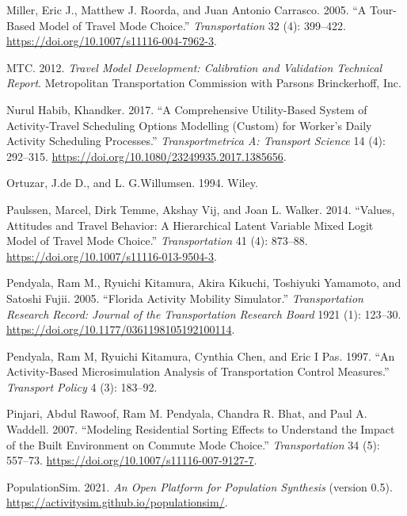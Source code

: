 \documentclass[12pt, oneside, openright]{byuthesis}
\newlength{\cslhangindent}
\newlength{\cslentryspacingunit} %
\newenvironment{CSLReferences}[2] %
 {%
  \setlength{\parindent}{0pt}
  \ifodd #1
  \let\oldpar\par
  \def\par{\hangindent=\cslhangindent\oldpar}
  \fi
  \setlength{\parskip}{#2\cslentryspacingunit}
 }%
 {}
\begin{document}
\begin{CSLReferences}{1}{0}
\leavevmode{}%
Miller, Eric J., Matthew J. Roorda, and Juan Antonio Carrasco. 2005. {``A Tour-Based Model of Travel Mode Choice.''} \emph{Transportation} 32 (4): 399--422. \url{https://doi.org/10.1007/s11116-004-7962-3}.

\leavevmode{}%
MTC. 2012. \emph{Travel Model Development: Calibration and Validation Technical Report}. Metropolitan Transportation Commission with Parsons Brinckerhoff, Inc.

\leavevmode{}%
Nurul Habib, Khandker. 2017. {``A Comprehensive Utility-Based System of Activity-Travel Scheduling Options Modelling (Custom) for Worker's Daily Activity Scheduling Processes.''} \emph{Transportmetrica A: Transport Science} 14 (4): 292--315. \url{https://doi.org/10.1080/23249935.2017.1385656}.

\leavevmode{}%
Ortuzar, J.de D., and L. G.Willumsen. 1994. Wiley.

\leavevmode{}%
Paulssen, Marcel, Dirk Temme, Akshay Vij, and Joan L. Walker. 2014. {``Values, Attitudes and Travel Behavior: A Hierarchical Latent Variable Mixed Logit Model of Travel Mode Choice.''} \emph{Transportation} 41 (4): 873--88. \url{https://doi.org/10.1007/s11116-013-9504-3}.

\leavevmode{}%
Pendyala, Ram M., Ryuichi Kitamura, Akira Kikuchi, Toshiyuki Yamamoto, and Satoshi Fujii. 2005. {``Florida Activity Mobility Simulator.''} \emph{Transportation Research Record: Journal of the Transportation Research Board} 1921 (1): 123--30. \url{https://doi.org/10.1177/0361198105192100114}.

\leavevmode{}%
Pendyala, Ram M, Ryuichi Kitamura, Cynthia Chen, and Eric I Pas. 1997. {``An Activity-Based Microsimulation Analysis of Transportation Control Measures.''} \emph{Transport Policy} 4 (3): 183--92.

\leavevmode{}%
Pinjari, Abdul Rawoof, Ram M. Pendyala, Chandra R. Bhat, and Paul A. Waddell. 2007. {``Modeling Residential Sorting Effects to Understand the Impact of the Built Environment on Commute Mode Choice.''} \emph{Transportation} 34 (5): 557--73. \url{https://doi.org/10.1007/s11116-007-9127-7}.

\leavevmode{}%
PopulationSim. 2021. \emph{An Open Platform for Population Synthesis} (version 0.5). \url{https://activitysim.github.io/populationsim/}.


\end{CSLReferences}
\end{document}
